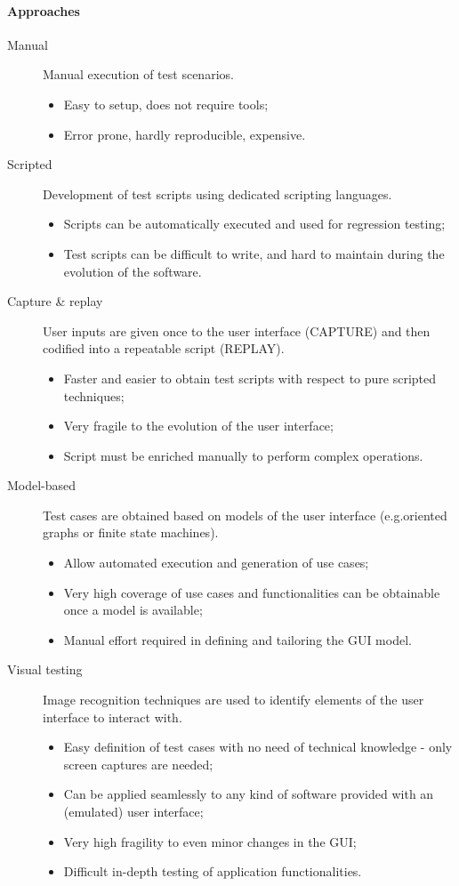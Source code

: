 \paragraph{Approaches}
\begin{description}
\item [Manual] Manual execution of test scenarios.
\begin{itemize}
\item Easy to setup, does not require tools;
\item Error prone, hardly reproducible, expensive.
\end{itemize}
\item [Scripted] Development of test scripts using dedicated scripting languages.
\begin{itemize}
\item Scripts can be automatically executed and used for regression testing;
\item Test scripts can be difficult to write, and hard to maintain during the evolution of the software.
\end{itemize}
\item [Capture \& replay] User inputs are given once to the user interface (CAPTURE) and then codified into a repeatable script (REPLAY).
\begin{itemize}
\item Faster and easier to obtain test scripts with respect to pure scripted techniques;
\item Very fragile to the evolution of the user interface;
\item Script must be enriched manually to perform complex operations.
\end{itemize}
\item [Model-based] Test cases are obtained based on models of the user interface (e.g.\@ oriented graphs or finite state machines).
\begin{itemize}
\item Allow automated execution and generation of use cases;
\item Very high coverage of use cases and functionalities can be obtainable once a model is available;
\item Manual effort required in defining and tailoring the GUI model.
\end{itemize}
\item [Visual testing] Image recognition techniques are used to identify elements of the user interface to interact with.
\begin{itemize}
\item Easy definition of test cases with no need of technical knowledge - only screen captures are needed;
\item Can be applied seamlessly to any kind of software provided with an (emulated) user interface;
\item Very high fragility to even minor changes in the GUI;
\item Difficult in-depth testing of application functionalities.
\end{itemize}
\end{description}

